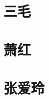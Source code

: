 \documentclass[12pt,utf8]{book}
\begin{document}
\chapter{三毛}




\clearpage

% 
% 



\clearpage


\chapter{萧红}



% 






\chapter{张爱玲}











\clearpage
\end{document}
